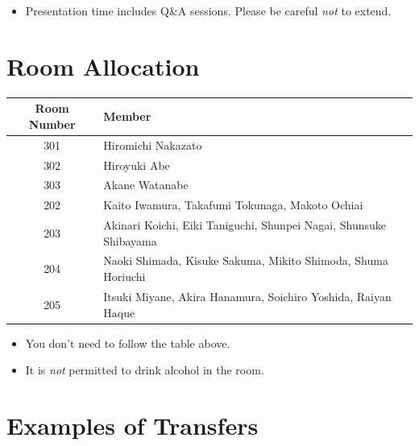\documentclass[unicode,a4paper,11pt]{ltjsarticle}
\begin{document}
\begin{itemize}
      \item
            Presentation time includes Q\&A sessions. Please be careful \textit{not} to extend.
\end{itemize}

\section{Room Allocation}

\begin{center}
      \begin{tabular}{cl}\hline
            Room Number & Member                                                            \\ \hline
            301         & Hiromichi Nakazato                                                \\
            302         & Hiroyuki Abe                                                      \\
            303         & Akane Watanabe                                                    \\
            202         & Kaito Iwamura, Takafumi Tokunaga, Makoto Ochiai                   \\
            203         & Akinari Koichi, Eiki Taniguchi, Shunpei Nagai, Shunsuke Shibayama \\
            204         & Naoki Shimada, Kisuke Sakuma, Mikito Shimoda, Shuma Horiuchi      \\
            205         & Itsuki Miyane, Akira Hanamura, Soichiro Yoshida, Raiyan Haque     \\ \hline
      \end{tabular}
\end{center}

\begin{itemize}
      \item
            You don't need to follow the table above.
      \item
            It is \textit{not} permitted to drink alcohol in the room.
\end{itemize}


\section{Examples of Transfers}

\vspace*{5pt}
\end{document}
